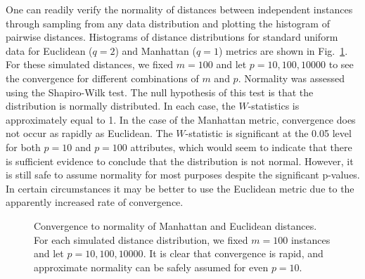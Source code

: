 \documentclass[10pt,letterpaper]{article}\usepackage[]{graphicx}\usepackage[]{color}
\begin{document}
One can readily verify the normality of distances between independent instances through sampling from any data distribution and plotting the histogram of pairwise distances. Histograms of distance distributions for standard uniform data for Euclidean ($q=2$) and Manhattan ($q=1$) metrics are shown in Fig.~\ref{fig:central_limit_convergence}. For these simulated distances, we fixed $m=100$ and let $p=10,100,10000$ to see the convergence for different combinations of $m$ and $p$. Normality was assessed using the Shapiro-Wilk test. The null hypothesis of this test is that the distribution is normally distributed. In each case, the $W$-statistics is approximately equal to 1. In the case of the Manhattan metric, convergence does not occur as rapidly as Euclidean. The $W$-statistic is significant at the 0.05 level for both $p=10$ and $p=100$ attributes, which would seem to indicate that there is sufficient evidence to conclude that the distribution is not normal. However, it is still safe to assume normality for most purposes despite the significant p-values. In certain circumstances it may be better to use the Euclidean metric due to the apparently increased rate of convergence.

\begin{figure}[ht!]
	\centering
	\caption{Convergence to normality of Manhattan and Euclidean distances. For each simulated distance distribution, we fixed $m=100$ instances and let $p=10,100,10000$. It is clear that convergence is rapid, and approximate normality can be safely assumed for even $p=10$.}\label{fig:central_limit_convergence}
\end{figure}
\end{document}
